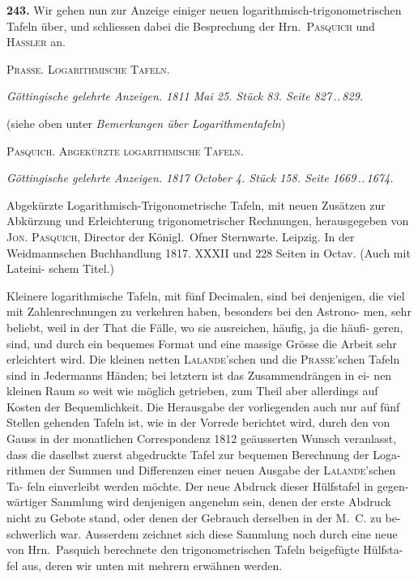 \documentclass[12pt,a4paper]{article}
\begin{document}
\newpage
\noindent\textbf{243.}\quad
Wir gehen nun zur Anzeige einiger neuen logarithmisch-trigonometrischen
Tafeln über, und schliessen dabei die Besprechung der Hrn.\ \textsc{Pasquich}
und \textsc{Hassler} an.

\bigskip
\begin{center}
\textsc{Prasse. Logarithmische Tafeln.}
\end{center}

\smallskip
\noindent\textit{Göttingische gelehrte Anzeigen. 1811 Mai 25. Stück 83. Seite 827\,..\,829.}

\smallskip\noindent
(siehe oben unter \textit{Bemerkungen über Logarithmentafeln})

\bigskip
\begin{center}
\textsc{Pasquich. Abgekürzte logarithmische Tafeln.}
\end{center}

\smallskip
\noindent\textit{Göttingische gelehrte Anzeigen. 1817 October 4. Stück 158. Seite 1669\,..\,1674.}

\smallskip\noindent
Abgekürzte Logarithmisch-Trigonometrische Tafeln, mit neuen Zusätzen zur
Abkürzung und Erleichterung trigonometrischer Rechnungen, herausgegeben von \textsc{Jon.}
\textsc{Pasquich}, Director der Königl.\ Ofner Sternwarte. Leipzig. In der Weidmannschen
Buchhandlung 1817. XXXII und 228 Seiten in Octav. (Auch mit Lateini-
schem Titel.)

\smallskip\noindent
Kleinere logarithmische Tafeln, mit fünf Decimalen, sind bei denjenigen,
die viel mit Zahlenrechnungen zu verkehren haben, besonders bei den Astrono-
men, sehr beliebt, weil in der That die Fälle, wo sie ausreichen, häufig, ja die häufi-
geren, sind, und durch ein bequemes Format und eine massige Grösse die Arbeit
sehr erleichtert wird. Die kleinen netten \textsc{Lalande}'schen und die \textsc{Prasse}'schen
Tafeln sind in Jedermanns Händen; bei letztern ist das Zusammendrängen in ei-
nen kleinen Raum so weit wie möglich getrieben, zum Theil aber allerdings auf
Kosten der Bequemlichkeit. Die Herausgabe der vorliegenden auch nur auf fünf
Stellen gehenden Tafeln ist, wie in der Vorrede berichtet wird, durch den von
Gauss in der monatlichen Correspondenz 1812 geäusserten Wunsch veranlasst,
dass die daselbst zuerst abgedruckte Tafel zur bequemen Berechnung der Loga-
rithmen der Summen und Differenzen einer neuen Ausgabe der \textsc{Lalande}'schen Ta-
feln einverleibt werden möchte. Der neue Abdruck dieser Hülfstafel in gegen-
wärtiger Sammlung wird denjenigen angenehm sein, denen der erste Abdruck
nicht zu Gebote stand, oder denen der Gebrauch derselben in der M.~C. zu be-
schwerlich war. Ausserdem zeichnet sich diese Sammlung noch durch eine neue
von Hrn.~Pasquich berechnete den trigonometrischen Tafeln beigefügte Hülfsta-
fel aus, deren wir unten mit mehrern erwähnen werden.
\end{document}
